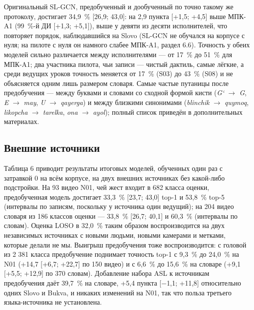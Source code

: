 \documentclass[a4paper,fleqn]{cas-dc}
\begin{document}
Оригинальный SL-GCN, предобученный и дообученный по точно такому же протоколу, достигает 34,9~\% {[}26,9; 43,0{]}: на 2,9 пункта {[}+1,5; +4,5{]} выше МПК-A1 (99~\%-й ДИ {[}+1,3; +5,1{]}), выше у девяти из десяти исполнителей, что повторяет порядок, наблюдавшийся на Slovo (SL-GCN не обучался на корпусе с нуля; на пилоте с нуля он намного слабее МПК-A1, раздел 6.6). Точность у обеих моделей сильно различается между исполнителями --- от 17~\% до 51~\% для МПК-A1; два участника пилота, чьи записи --- чистый дактиль, самые лёгкие, а среди ведущих уроков точность меняется от 17~\% (S03) до 43~\% (S08) и не объясняется одним лишь размером словаря. Самые частые путаницы после предобучения --- между буквами и словами со сходной формой кисти (\emph{G‘} $\rightarrow$ \emph{G}, \emph{E} $\rightarrow$ \emph{may}, \emph{U} $\rightarrow$ \emph{qayerga}) и между близкими синонимами (\emph{blinchik} $\rightarrow$ \emph{quymoq}, \emph{likopcha} $\rightarrow$ \emph{tarelka}, \emph{ona} $\rightarrow$ \emph{ayol}); полный список приведён в дополнительных материалах.

\hypertarget{ux432ux43dux435ux448ux43dux438ux435-ux438ux441ux442ux43eux447ux43dux438ux43aux438-1}{%
\subsection{Внешние источники}\label{ux432ux43dux435ux448ux43dux438ux435-ux438ux441ux442ux43eux447ux43dux438ux43aux438-1}}

Таблица 6 приводит результаты итоговых моделей, обученных один раз с затравкой 0 на всём корпусе, на двух внешних источниках без какой-либо подстройки. На 93 видео N01, чей жест входит в 682 класса оценки, предобученная модель достигает 33,3~\% {[}23,7; 43,0{]} top-1 и 53,8~\% top-5 (интервалы по записям, поскольку у источника один ведущий); на 204 видео словаря из 186 классов оценки --- 33,8~\% {[}26,7; 40,1{]} и 60,3~\% (интервалы по словам). Оценка LOSO в 32,0~\% таким образом воспроизводится на двух независимых источниках с новыми людьми, новыми камерами и метками, которые делали не мы. Выигрыш предобучения тоже воспроизводится: с головой из 2 381 класса предобучение поднимает точность top-1 с 9,3~\% до 24,0~\% на N01 (+14,7 {[}+6,7; +22,7{]} по 150 видео) и с 6,6~\% до 15,6~\% на словаре (+9,1 {[}+5,5; +12,9{]} по 370 словам). Добавление набора ASL к источникам предобучения даёт 39,7~\% на словаре, +5,4 пункта {[}$-$1,1; +11,8{]} относительно одних Slovo и Bukva, и никаких изменений на N01, так что польза третьего языка-источника не установлена.
\end{document}
